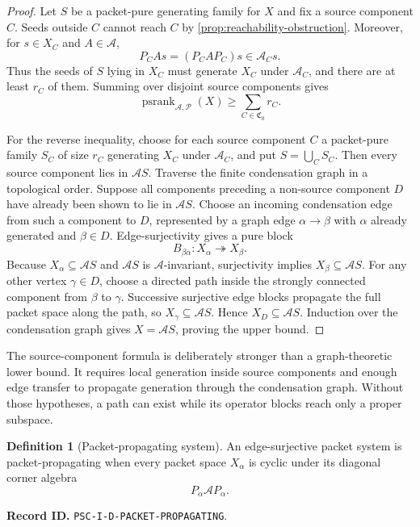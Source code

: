 \documentclass[11pt]{article}
\theoremstyle{definition}
\newtheorem{definition}[definition]{Definition}
\theoremstyle{remark}
\newcommand{\A}{\mathcal A}
\newcommand{\Pcal}{\mathcal P}
\newcommand{\psrank}{\operatorname{psrank}}
\newcommand{\RecordID}[1]{\par\smallskip\noindent\begingroup\footnotesize\color{PSCGray}\raggedright\textbf{Record ID.} \nolinkurl{#1}.\par\endgroup}
\begin{document}
\begin{proof}
Let $S$ be a packet-pure generating family for $X$ and fix a source component $C$.  Seeds outside $C$ cannot reach $C$ by \cref{prop:reachability-obstruction}.  Moreover, for $s\in X_C$ and $A\in\A$,
\[
P_CAs=(P_CAP_C)s\in\A_Cs.
\]
Thus the seeds of $S$ lying in $X_C$ must generate $X_C$ under $\A_C$, and there are at least $r_C$ of them.  Summing over disjoint source components gives
\[
\psrank_{\A,\Pcal}(X)
\geq
\sum_{C\in\mathfrak C_0}r_C.
\]

For the reverse inequality, choose for each source component $C$ a packet-pure family $S_C$ of size $r_C$ generating $X_C$ under $\A_C$, and put $S=\bigcup_CS_C$.  Then every source component lies in $\A S$.  Traverse the finite condensation graph in a topological order.  Suppose all components preceding a non-source component $D$ have already been shown to lie in $\A S$.  Choose an incoming condensation edge from such a component to $D$, represented by a graph edge $\alpha\to\beta$ with $\alpha$ already generated and $\beta\in D$.  Edge-surjectivity gives a pure block
\[
B_{\beta\alpha}:X_\alpha\twoheadrightarrow X_\beta.
\]
Because $X_\alpha\subseteq\A S$ and $\A S$ is $\A$-invariant, surjectivity implies $X_\beta\subseteq\A S$.  For any other vertex $\gamma\in D$, choose a directed path inside the strongly connected component from $\beta$ to $\gamma$.  Successive surjective edge blocks propagate the full packet space along the path, so $X_\gamma\subseteq\A S$.  Hence $X_D\subseteq\A S$.  Induction over the condensation graph gives $X=\A S$, proving the upper bound.
\end{proof}

\begin{hypothesisguide}
The source-component formula is deliberately stronger than a graph-theoretic lower bound.  It requires local generation inside source components and enough edge transfer to propagate generation through the condensation graph.  Without those hypotheses, a path can exist while its operator blocks reach only a proper subspace.
\end{hypothesisguide}


\begin{definition}[Packet-propagating system]
\label{def:packet-propagating}
An edge-surjective packet system is packet-propagating when every packet space $X_\alpha$ is cyclic under its diagonal corner algebra
\[
P_\alpha\A P_\alpha.
\]
\end{definition}
\RecordID{PSC-I-D-PACKET-PROPAGATING}
\end{document}
